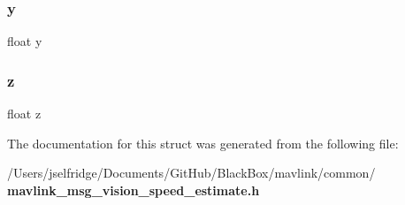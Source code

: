 \mbox{\label{struct____mavlink__vision__speed__estimate__t_aa4f0d3eebc3c443f9be81bf48561a217}} 
\subsubsection{y}
{\footnotesize\ttfamily float y}

\mbox{\label{struct____mavlink__vision__speed__estimate__t_af73583b1e980b0aa03f9884812e9fd4d}} 
\subsubsection{z}
{\footnotesize\ttfamily float z}



The documentation for this struct was generated from the following file\+:\begin{DoxyCompactItemize}
\item 
/\+Users/jselfridge/\+Documents/\+Git\+Hub/\+Black\+Box/mavlink/common/\textbf{ mavlink\+\_\+msg\+\_\+vision\+\_\+speed\+\_\+estimate.\+h}\end{DoxyCompactItemize}
